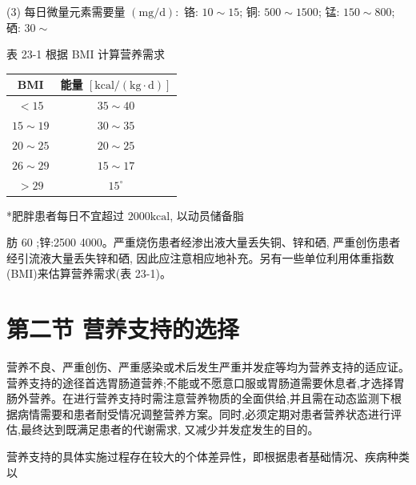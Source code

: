 \documentclass[10pt]{article}
\begin{document}
(3) 每日微量元素需要量 $(\mathrm{mg} / \mathrm{d}):$ 铬: $10 \sim 15$; 铜: $500 \sim 1500$; 锰: $150 \sim 800$; 硒: $30 \sim$

表 23-1 根据 BMI 计算营养需求

\begin{center}
\begin{tabular}{cc}
\hline
BMI & 能量 $[\mathrm{kcal} /(\mathrm{kg} \cdot \mathrm{d})]$ \\
\hline
$<15$ & $35 \sim 40$ \\
$15 \sim 19$ & $30 \sim 35$ \\
$20 \sim 25$ & $20 \sim 25$ \\
$26 \sim 29$ & $15 \sim 17$ \\
$>29$ & $15^{\circ}$ \\
\hline
\end{tabular}
\end{center}

*肥胖患者每日不宜超过 $2000 \mathrm{kcal}$, 以动员储备脂

肪 60 ;锌:2500 4000。严重烧伤患者经渗出液大量丢失铜、锌和硒, 严重创伤患者经引流液大量丢失锌和硒, 因此应注意相应地补充。另有一些单位利用体重指数(BMI)来估算营养需求(表 23-1)。

\section*{第二节 营养支持的选择}
营养不良、严重创伤、严重感染或术后发生严重并发症等均为营养支持的适应证。营养支持的途径首选胃肠道营养;不能或不愿意口服或胃肠道需要休息者,才选择胃肠外营养。在进行营养支持时需注意营养物质的全面供给,并且需在动态监测下根据病情需要和患者耐受情况调整营养方案。同时,必须定期对患者营养状态进行评估,最终达到既满足患者的代谢需求, 又减少并发症发生的目的。

营养支持的具体实施过程存在较大的个体差异性，即根据患者基础情况、疾病种类以
\end{document}

